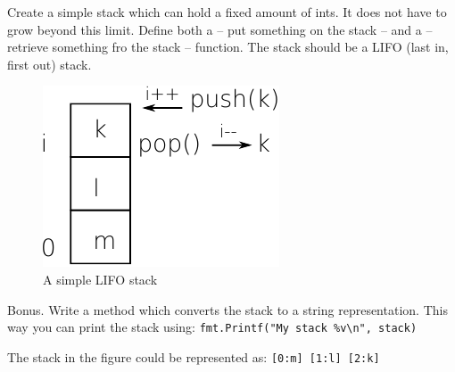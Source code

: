 \begin{Exercise}[title={Stack},difficulty=5]
\label{ex:stack}
\Question \label{ex:stack q1} Create a simple stack which can hold a
fixed amount of ints. It does not have to grow beyond this limit.
Define both a  -- put something on the stack -- and a  
-- retrieve something fro the stack -- function. The stack should be
a LIFO (last in, first out) stack.

\begin{figure}[H]
\caption{A simple LIFO stack}
\label{fig:stack}
\begin{center}
\includegraphics[scale=0.65]{fig/stack.pdf}
\end{center}
\end{figure}

\Question \label{ex:stack q2} Bonus. Write a  method which 
converts the stack to a string representation.  This way you can print the stack using:
\lstinline{fmt.Printf("My stack %v\n", stack)}

\noindent{}The stack in the figure could be represented as:
\texttt{[0:m] [1:l] [2:k]}

\end{Exercise}


